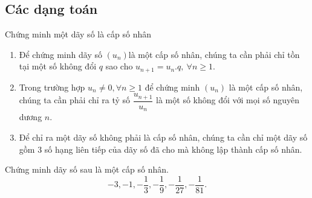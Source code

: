 \subsection{Các dạng toán}
\newpage
\begin{dang}{Chứng minh một dãy số là cấp số nhân}
\begin{enumerate}
	\item Để chứng minh dãy số $(u_n)$là một cấp số nhân, chúng ta cần phải chỉ tồn tại một số không đổi $q$ sao cho $u_{n+1}=u_n. q, \ \forall n\ge 1$. 
	\item Trong trường hợp $u_n\ne 0, \forall n\ge 1$ để chứng minh $(u_n)$ là một cấp số nhân, chúng ta cần phải chỉ ra tỷ số $\dfrac{u_{n+1}}{u_n}$ là một số không đổi với mọi số nguyên dương $n$. 
	\item Để chỉ ra một dãy số không phải là cấp số nhân, chúng ta cần chỉ một dãy số gồm $3$ số hạng liên tiếp của dãy số đã cho mà không lập thành cấp số nhân. 
\end{enumerate}
\end{dang}
\begin{vd}%
	Chứng minh dãy số sau là một cấp số nhân. 
	$$-3, -1, -\dfrac{1}{3}, -\dfrac{1}{9}, -\dfrac{1}{27}, -\dfrac{1}{81}.$$
\end{vd}
